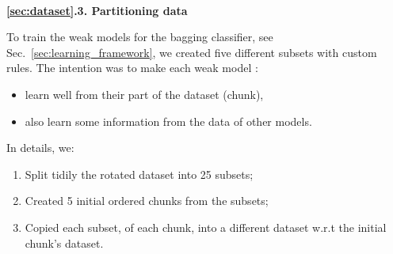 	
	
	
\ \\ %
\textbf{\ref{sec:dataset}.3. Partitioning data}

To train the weak models for the bagging classifier, see Sec.~\ref{sec:learning_framework}, we created five different subsets with custom rules. 
The intention was to make each weak model :
\begin{itemize}
    \item learn well from their part of the dataset (chunk),
    \item also learn some information from the data of other models.
\end{itemize}

In details, we:
\begin{enumerate}
    \item Split tidily the rotated dataset into 25 subsets;
    \item Created 5 initial ordered chunks from the subsets;
    \item Copied each subset, of each chunk, into a different dataset w.r.t the initial chunk's dataset.
\end{enumerate}

